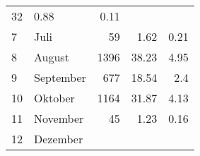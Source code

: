 \begin{longtable}{lXrrr}
       \num{32} &
       \num[round-mode=places,round-precision=2]{0,88} &
         \num[round-mode=places,round-precision=2]{0,11} \\

     7 &
     \multicolumn{1}{X}{ Juli   } &


       \num{59} &
       \num[round-mode=places,round-precision=2]{1,62} &
         \num[round-mode=places,round-precision=2]{0,21} \\

     8 &
     \multicolumn{1}{X}{ August   } &


       \num{1396} &
       \num[round-mode=places,round-precision=2]{38,23} &
         \num[round-mode=places,round-precision=2]{4,95} \\

     9 &
     \multicolumn{1}{X}{ September   } &


       \num{677} &
       \num[round-mode=places,round-precision=2]{18,54} &
         \num[round-mode=places,round-precision=2]{2,4} \\

     10 &
     \multicolumn{1}{X}{ Oktober   } &


       \num{1164} &
       \num[round-mode=places,round-precision=2]{31,87} &
         \num[round-mode=places,round-precision=2]{4,13} \\

     11 &
     \multicolumn{1}{X}{ November   } &


       \num{45} &
       \num[round-mode=places,round-precision=2]{1,23} &
         \num[round-mode=places,round-precision=2]{0,16} \\

     12 &
     \multicolumn{1}{X}{ Dezember   } &



\end{longtable}
